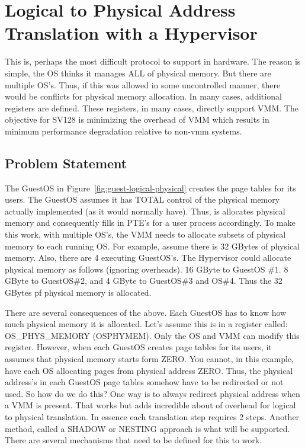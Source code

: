 \documentclass{article}
\begin{document}
\section{Logical to Physical Address Translation with a Hypervisor}


This is, perhaps the most difficult   protocol to support in hardware.  The reason is simple,  the OS thinks it manages ALL of physical memory.  But there  are multiple OS’s.  Thus, if this was allowed in some uncontrolled manner, there would be conflicts for physical memory allocation. In many cases,  additional registers are defined.  These registers, in many cases,  directly support VMM.  The objective for SV128 is minimizing the overhead of VMM which results in minimum performance degradation relative to non-vmm systems.

\subsection{Problem Statement}

The GuestOS in Figure~\ref{fig:guest-logical-physical} creates the page tables for its users.  The GuestOS assumes it has TOTAL control of the physical memory actually implemented (as it would normally have).  Thus, is allocates physical memory and  consequently fills in PTE’s for a user process accordingly.    To make this work, with multiple OS’s,  the VMM needs to allocate subsets of physical memory to each running OS.  For example,  assume there is 32 GBytes of physical memory.  Also, there are 4 executing GuestOS’s.  The Hypervisor could allocate physical memory as follows (ignoring overheads).  16 GByte to GuestOS \#1.  8 GByte to GuestOS\#2,  and 4 GByte to GuestOS\#3 and OS\#4. Thus the 32 GBytes pf physical memory is allocated.  

There are several consequences of the above.  Each GuestOS has to know how much physical memory it is allocated.  Let’s assume this is in a register called:  OS\_PHYS\_MEMORY (OSPHYMEM).   Only the OS and VMM can modify this register.  However, when each GuestOS creates page tables for its users,  it assumes that physical memory starts form ZERO.  You cannot, in this example,  have each OS allocating pages from physical address ZERO. Thus, the physical address’s in each GuestOS page tables  somehow have to be redirected or not used. So how do we do this? One way is to always redirect physical address when a VMM is present.  That works but adds incredible about of overhead for logical to physical translation.  In essence each translation step requires 2 steps.  Another  method,   called a SHADOW or NESTING approach is what will be supported.  There are several mechanisms that need to be defined for this to work.
\end{document}
